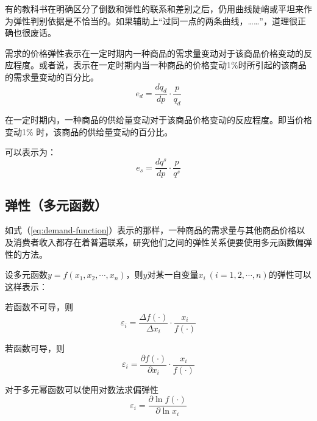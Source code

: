 有的教科书在明确区分了倒数和弹性的联系和差别之后，仍用曲线陡峭或平坦来作为弹性判别依据是不恰当的。如果辅助上“过同一点的两条曲线，……”，道理很正确也很废话。

\begin{Definition}[需求的价格弹性]
需求的价格弹性表示在一定时期内一种商品的需求量变动对于该商品价格变动的反应程度。或者说，表示在一定时期内当一种商品的价格变动1\%时所引起的该商品的需求量变动的百分比。
\begin{equation}
	{e_d} = \frac{d{q_d}}{dp} \cdot \frac{p}{q_d}
\label{equ:elasticity-of-demand}
\end{equation}
\end{Definition}

\begin{Definition}[供给的价格弹性]
在一定时期内，一种商品的供给量变动对于该商品价格变动的反应程度。即当价格变动1\% 时，该商品的供给量变动的百分比。
\end{Definition}
可以表示为：
\begin{equation}
	e_s = \frac{dq^s}{dp} \cdot \frac{p}{q^s}
\end{equation}

\subsection{弹性（多元函数）}
\label{sec:multi-variables-math-elasticity}
如式（\ref{eq:demand-function}）表示的那样，一种商品的需求量与其他商品价格以及消费者收入都存在着普遍联系，研究他们之间的弹性关系便要使用多元函数偏弹性的方法。

设多元函数$y=f(x_1,x_2,\cdots,x_n)$，则$y$对某一自变量$x_i~(i=1,2,\cdots,n)$的弹性可以这样表示：
\begin{compactenum}
\item 若函数不可导，则
\begin{equation}
\varepsilon_i = \frac{\Delta f(\cdot)}{\Delta x_i} \cdot \frac{x_i}{f(\cdot)}
\end{equation}
\item 若函数可导，则
\begin{equation}
\varepsilon_i = \frac{\partial f(\cdot)}{\partial x_i} \cdot \frac{x_i}{f(\cdot)}
\end{equation}
\item 对于多元幂函数可以使用对数法求偏弹性
\begin{equation}
\varepsilon_i = \frac{\partial \ln f(\cdot)}{\partial \ln x_i}
\end{equation}

\end{compactenum}

